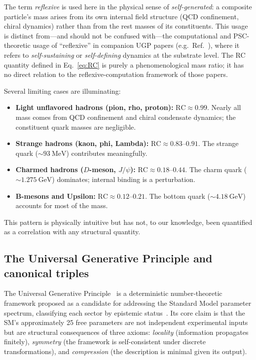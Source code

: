 \documentclass[12pt,a4paper]{article}
\newcommand{\RC}{\ensuremath{\mathrm{RC}}}
\begin{document}
\begin{tcolorbox}[colback=orange!4!white, colframe=orange!65!black,
  title={\textbf{Terminology note: ``reflexive'' in this paper vs.\ companion papers}}]
The term \emph{reflexive} is used here in the physical sense of
\emph{self-generated}: a composite particle's mass arises from its own
internal field structure (QCD confinement, chiral dynamics) rather than
from the rest masses of its constituents.
This usage is distinct from---and should not be confused with---the
computational and PSC-theoretic usage of ``reflexive'' in companion UGP papers
(e.g.\ Ref.~\cite{Spivack2026_SM_UGP}), where it refers to
\emph{self-sustaining} or \emph{self-defining} dynamics at the substrate level.
The RC quantity defined in Eq.~\eqref{eq:RC} is purely a phenomenological mass ratio;
it has no direct relation to the reflexive-computation framework of those papers.
\end{tcolorbox}

Several limiting cases are illuminating:
\begin{itemize}[leftmargin=2em]
  \item \textbf{Light unflavored hadrons (pion, rho, proton):} $\RC \approx 0.99$.
    Nearly all mass comes from QCD confinement and chiral condensate dynamics;
    the constituent quark masses are negligible.
  \item \textbf{Strange hadrons (kaon, phi, Lambda):}
    $\RC \approx 0.83$--$0.91$.
    The strange quark ($\sim\SI{93}{\mega\eV}$) contributes meaningfully.
  \item \textbf{Charmed hadrons ($D$-meson, $J/\psi$):} $\RC \approx 0.18$--$0.44$.
    The charm quark ($\sim\SI{1.275}{\giga\eV}$) dominates; internal binding
    is a perturbation.
  \item \textbf{B-mesons and Upsilon:} $\RC \approx 0.12$--$0.21$.
    The bottom quark ($\sim\SI{4.18}{\giga\eV}$) accounts for most of the mass.
\end{itemize}

This pattern is physically intuitive but has not, to our knowledge, been
quantified as a correlation with any structural quantity.

\subsection{The Universal Generative Principle and canonical triples}
\label{subsec:ugp-intro}

The Universal Generative Principle~\cite{Spivack2026_SM_UGP,SpivackUGPFormalization}
is a deterministic number-theoretic framework proposed as a candidate for
addressing the Standard Model parameter spectrum, classifying each sector by epistemic status~\cite{Spivack2026_SM_UGP}.
Its core claim is that the SM's approximately 25 free parameters are not
independent experimental inputs but are structural consequences of three
axioms: \emph{locality} (information propagates finitely), \emph{symmetry}
(the framework is self-consistent under discrete transformations), and
\emph{compression} (the description is minimal given its output).
\end{document}
